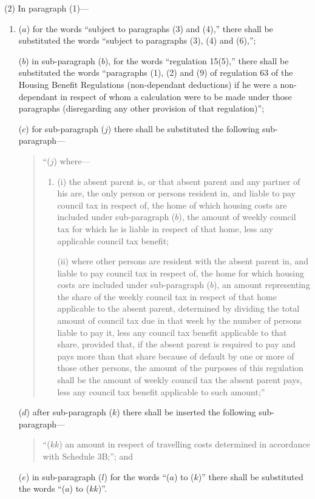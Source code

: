 \documentclass[12pt,a4paper]{article}
\begin{document}
(2) In paragraph (1)—
\begin{enumerate}\item[]
($a$) for the words “subject to paragraphs (3) and (4),” there shall be substituted the words “subject to paragraphs (3), (4) and (6),”;

($b$) in sub-paragraph ($b$), for the words “regulation 15(5),” there shall be substituted the words “paragraphs (1), (2) and (9) of regulation 63 of the Housing Benefit Regulations (non-dependant deductions) if he were a non-dependant in respect of whom a calculation were to be made under those paragraphs (disregarding any other provision of that regulation)”;

($c$) for sub-paragraph ($j$) there shall be substituted the following sub-paragraph—
\begin{quotation}
“($j$) where—
\begin{enumerate}\item[]
(i) the absent parent is, or that absent parent and any partner of his are, the only person or persons resident in, and liable to pay council tax in respect of, the home of which housing costs are included under sub-paragraph ($b$), the amount of weekly council tax for which he is liable in respect of that home, less any applicable council tax benefit;

(ii) where other persons are resident with the absent parent in, and liable to pay council tax in respect of, the home for which housing costs are included under sub-paragraph ($b$), an amount representing the share of the weekly council tax in respect of that home applicable to the absent parent, determined by dividing the total amount of council tax due in that week by the number of persons liable to pay it, less any council tax benefit applicable to that share, provided that, if the absent parent is required to pay and pays more than that share because of default by one or more of those other persons, the amount of the purposes of this regulation shall be the amount of weekly council tax the absent parent pays, less any council tax benefit applicable to such amount;”
\end{enumerate}
\end{quotation}

($d$) after sub-paragraph ($k$) there shall be inserted the following sub-paragraph—
\begin{quotation}
“($kk$) an amount in respect of travelling costs determined in accordance with Schedule 3B;”; and
\end{quotation}

($e$) in sub-paragraph ($l$) for the words “($a$) to ($k$)” there shall be substituted the words “($a$) to ($kk$)”.
\end{enumerate}
\end{document}
